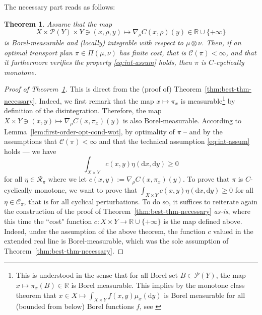 \documentclass[leqno, 11pt, a4paper]{amsart}
\newtheorem{thm}{Theorem}
\theoremstyle{definition}
\newcommand{\cR}{\mathcal{R}}
\newcommand{\cC}{\mathcal{C}}
\newcommand{\R}{\mathbb{R}}
\newcommand{\C}{\mathscr{C}}
\newcommand{\cP}{\mathcal{P}}
\newcommand{\dd}{\mathrm{d}}
\newcommand{\extendedR}{\R \cup \{+\infty\}}
\begin{document}
The necessary part reads as follows:
\begin{thm}\label{thm:necessary-wot}
	Assume that the map $$X \times \cP(Y) \times Y \ni (x, \rho, y) \mapsto \nabla_\rho C(x, \rho)(y) \in \extendedR$$ is Borel-measurable and (locally) integrable with respect to $\mu \otimes \nu$. Then, if an optimal transport plan $\pi \in \Pi(\mu, \nu)$ has finite cost, that is $\C(\pi) < \infty$, and that it  furthermore verifies the property \eqref{eq:int-assum} holds, then $\pi$ is $C$-cyclically monotone.  
\end{thm}
\begin{proof}[Proof of Theorem~\ref{thm:necessary-wot}]
This is direct from the (proof of) 
Theorem~\ref{thm:best-thm-necessary}. Indeed, we 
first remark that the map $x \mapsto \pi_x$ is 
measurable\footnote{This is understood in 
the sense that for all Borel set $B \in \cP(Y)$, 
the map $x \mapsto \pi_x(B) \in \R$ is Borel 
measurable. This implies by the monotone class theorem that $x \in X \mapsto \int_{X \times Y} f(x,y) \mu_x(\dd y)$ is Borel measurable for all (bounded from below) Borel functions $f$, see \cite[Section 5.3]{GradientFlows2008a}} by definition of the disintegration. 
Therefore, the map $X \times Y \ni (x, y) \mapsto 
\nabla_\rho C(x, \pi_x)(y)$ is also Borel-measurable. According to Lemma~\ref{lem:first-order-opt-cond-wot}, by optimality of $\pi$ -- 
and by the assumptions that $\C(\pi) < \infty$ 
and that the technical assumption \eqref{eq:int-assum} holds — we have $$\int_{X \times Y} c(x, y) 
\eta(\dd x, \dd y) \geq 0$$ for all $\eta \in 
\cR_\pi$ where we let $c(x, y) :=\nabla_\rho C(x, 
\pi_x)(y)$. To prove that $\pi$ is $C$-cyclically 
monotone, we want to prove that $\int_{X \times 
Y} c(x, y)  \eta(\dd x,\dd y) \geq 0$ for all 
$\eta \in \cC_\pi$, that is for all cyclical 
perturbations. To do so, it suffices to reiterate 
again the construction of the proof of 
Theorem~\ref{thm:best-thm-necessary} \textit{as-is}, where this time the ``cost" function $c : X 
\times Y \to \extendedR$ is the map defined 
above. Indeed, under the assumption of the above 
theorem, the function $c$ valued in the extended 
real line is Borel-measurable, which was the 
sole assumption of Theorem~\ref{thm:best-thm-necessary}.
\end{proof}
\end{document}
